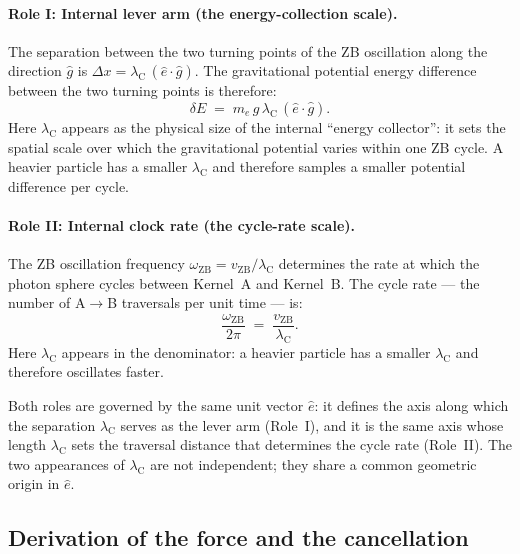 \documentclass[%
 reprint, amsmath,amssymb, aps, prb, ]{revtex4-2}
\numberwithin{equation}{section}
\newcommand{\omZB}{\omega_{\text{ZB}}}
\newcommand{\lambdaC}{\lambda_{\mathrm{C}}}
\newcommand{\vZB}{v_{\mathrm{ZB}}}
\begin{document}
\paragraph{Role I: Internal lever arm (the energy-collection scale).}
The separation between the two turning points of the ZB oscillation along the direction $\hat{g}$ is $\Delta x = \lambdaC\,(\hat{e}\cdot\hat{g})$.
The gravitational potential energy difference between the two turning points is therefore:
\begin{equation}
\delta E \;=\; m_e\,g\,\lambdaC\,(\hat{e}\cdot\hat{g}).
\label{eq:dE}
\end{equation}
Here $\lambdaC$ appears as the physical size of the internal ``energy collector'': it sets the spatial scale over which the gravitational potential varies within one ZB cycle.
A heavier particle has a smaller $\lambdaC$ and therefore samples a smaller potential difference per cycle.

\paragraph{Role II: Internal clock rate (the cycle-rate scale).}
The ZB oscillation frequency $\omZB = \vZB/\lambdaC$ determines the rate at which the photon sphere cycles between Kernel~A and Kernel~B.
The cycle rate --- the number of A$\to$B traversals per unit time --- is:
\begin{equation}
\frac{\omZB}{2\pi} \;=\; \frac{\vZB}{\lambdaC}.
\label{eq:cycle_rate}
\end{equation}
Here $\lambdaC$ appears in the denominator: a heavier particle has a smaller $\lambdaC$ and therefore oscillates faster.

Both roles are governed by the same unit vector $\hat{e}$: it defines the axis along which the separation $\lambdaC$ serves as the lever arm (Role~I), and it is the same axis whose length $\lambdaC$ sets the traversal distance that determines the cycle rate (Role~II).
The two appearances of $\lambdaC$ are not independent; they share a common geometric origin in $\hat{e}$.

\subsection{Derivation of the force and the cancellation}
\label{subsec:derivation}
\end{document}
